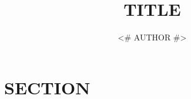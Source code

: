 \documentclass{article}
\title{TITLE}
\author{<# AUTHOR #>}
\begin{document}
\maketitle

\section{SECTION}
\end{document}
